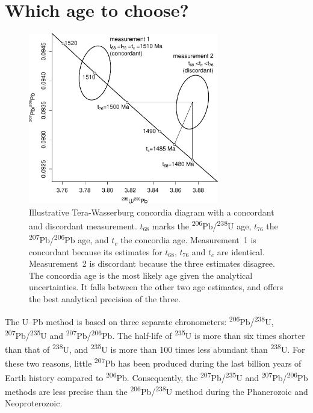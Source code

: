 \documentclass[gchron, manuscript]{copernicus}
\begin{document}
\section{Which age to choose?}\label{sec:whichage}

\begin{figure}[t]
  \includegraphics[width=8.3cm]{TW1500.pdf}
  \caption{Illustrative Tera-Wasserburg concordia diagram with a
    concordant and discordant measurement. $t_{68}$ marks the
    \textsuperscript{206}Pb/\textsuperscript{238}U age, $t_{76}$ the
    \textsuperscript{207}Pb/\textsuperscript{206}Pb age, and $t_{c}$
    the concordia age. Measurement~1 is concordant because its
    estimates for $t_{68}$, $t_{76}$ and $t_{c}$ are
    identical. Measurement~2 is discordant because the three estimates
    disagree. The concordia age is the most likely age given the
    analytical uncertainties. It falls between the other two age
    estimates, and offers the best analytical precision of the
    three.}
  \label{fig:concordia}
\end{figure}

The U--Pb method is based on three separate chronometers:
\textsuperscript{206}Pb/\textsuperscript{238}U,
\textsuperscript{207}Pb/\textsuperscript{235}U and
\textsuperscript{207}Pb/\textsuperscript{206}Pb. The half-life of
\textsuperscript{235}U is more than six times shorter than that of
\textsuperscript{238}U, and \textsuperscript{235}U is more than 100
times less abundant than \textsuperscript{238}U. For these two
reasons, little \textsuperscript{207}Pb has been produced during the
last billion years of Earth history compared to
\textsuperscript{206}Pb. Consequently, the
\textsuperscript{207}Pb/\textsuperscript{235}U and
\textsuperscript{207}Pb/\textsuperscript{206}Pb methods are less
precise than the \textsuperscript{206}Pb/\textsuperscript{238}U method
during the Phanerozoic and Neoproterozoic.
\end{document}
